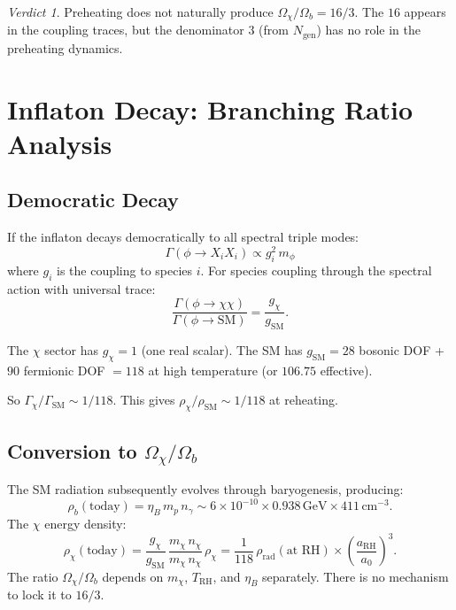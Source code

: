 \documentclass[11pt]{article}
\theoremstyle{definition}
\theoremstyle{remark}
\newtheorem*{verdict}{Verdict}
\newcommand{\GeV}{\,\mathrm{GeV}}
\begin{document}
\begin{verdict}
Preheating does not naturally produce $\Omega_\chi/\Omega_b = 16/3$.
The $16$ appears in the coupling traces, but the denominator $3$ (from
$N_\mathrm{gen}$) has no role in the preheating dynamics.
\end{verdict}


\section{Inflaton Decay: Branching Ratio Analysis}
\label{sec:decay}

\subsection{Democratic Decay}

If the inflaton decays democratically to all spectral triple modes:
\begin{equation}
  \Gamma(\phi \to X_i X_i) \propto g_i^2\,m_\phi
\end{equation}
where $g_i$ is the coupling to species $i$. For species coupling through
the spectral action with universal trace:
\begin{equation}
  \frac{\Gamma(\phi \to \chi\chi)}{\Gamma(\phi \to \mathrm{SM})}
  = \frac{g_\chi}{g_\mathrm{SM}}.
\end{equation}

The $\chi$ sector has $g_\chi = 1$ (one real scalar). The SM has
$g_\mathrm{SM} = 28$ bosonic DOF + $90$ fermionic DOF $= 118$ at high
temperature (or $106.75$ effective).

So $\Gamma_\chi/\Gamma_\mathrm{SM} \sim 1/118$. This gives
$\rho_\chi/\rho_\mathrm{SM} \sim 1/118$ at reheating.

\subsection{Conversion to $\Omega_\chi/\Omega_b$}

The SM radiation subsequently evolves through baryogenesis, producing:
\begin{equation}
  \rho_b(\text{today}) = \eta_B\,m_p\,n_\gamma
  \sim 6 \times 10^{-10} \times 0.938\GeV \times 411\,\mathrm{cm}^{-3}.
\end{equation}
The $\chi$ energy density:
\begin{equation}
  \rho_\chi(\text{today}) = \frac{g_\chi}{g_\mathrm{SM}}\,
  \frac{m_\chi\,n_\chi}{m_\chi\,n_\chi}\,\rho_\chi
  = \frac{1}{118}\,\rho_\mathrm{rad}(\text{at RH})
  \times \left(\frac{a_\mathrm{RH}}{a_0}\right)^3.
\end{equation}
The ratio $\Omega_\chi/\Omega_b$ depends on $m_\chi$, $T_\mathrm{RH}$,
and $\eta_B$ separately. There is no mechanism to lock it to $16/3$.
\end{document}
